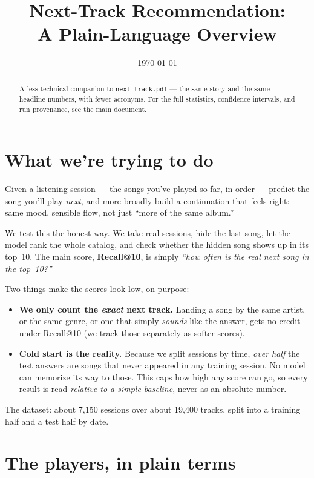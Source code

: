 \documentclass[11pt]{article}
\title{Next-Track Recommendation:\\ A Plain-Language Overview}
\author{}
\date{\today}
\begin{document}
\maketitle

\begin{abstract}
\noindent A less-technical companion to \texttt{next-track.pdf} --- the same
story and the same headline numbers, with fewer acronyms. For the full
statistics, confidence intervals, and run provenance, see the main document.
\end{abstract}

\section*{What we're trying to do}

Given a listening session --- the songs you've played so far, in order ---
predict the song you'll play \emph{next}, and more broadly build a continuation
that feels right: same mood, sensible flow, not just ``more of the same album.''

We test this the honest way. We take real sessions, hide the last song, let the
model rank the whole catalog, and check whether the hidden song shows up in its
top~10. The main score, \textbf{Recall@10}, is simply \emph{``how often is the
real next song in the top~10?''}

Two things make the scores look low, on purpose:

\begin{itemize}
  \item \textbf{We only count the \emph{exact} next track.} Landing a song by the
  same artist, or the same genre, or one that simply \emph{sounds} like the
  answer, gets no credit under Recall@10 (we track those separately as softer
  scores).
  \item \textbf{Cold start is the reality.} Because we split sessions by time,
  \emph{over half} the test answers are songs that never appeared in any training
  session. No model can memorize its way to those. This caps how high any score
  can go, so every result is read \emph{relative to a simple baseline}, never as
  an absolute number.
\end{itemize}

The dataset: about 7{,}150 sessions over about 19{,}400 tracks, split into a
training half and a test half by date.

\section*{The players, in plain terms}
\end{document}

